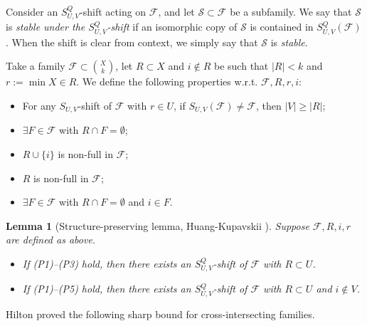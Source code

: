 \documentclass[a4paper,11pt]{article}
\newtheorem{lemma}[theorem]{Lemma}
\newcommand{\m}{\mathcal}
\begin{document}
Consider an $S_{U,V}^Q$-shift acting on $\mathcal{F}$, and let $\mathcal{S} \subset \mathcal{F}$ be a subfamily. 
We say that $\mathcal{S}$ is \emph{stable under the $S_{U,V}^Q$-shift} if an isomorphic copy of $\mathcal{S}$ is contained in $S_{U,V}^Q(\mathcal{F})$. When the shift is clear from context, we simply say that $\mathcal{S}$ is \emph{stable}.


Take a family $\m F\subset {X\choose k}$, let $R\subset X$ and $i\not\in R$ be such that $|R|<k$ and $r:=\min X\in R$. We define the following properties w.r.t. $\m F, R,r, i$: 

\begin{itemize}
\item[(P1)] For any $S_{U,V}$-shift of $\mathcal{F}$ with $r\in U$, if $S_{U,V}(\m F)\ne \m F$, then $|V|\ge |R|$;
\end{itemize}
\vspace{-0.3em}
\noindent
\begin{minipage}[t]{0.48\textwidth}
\begin{itemize}
\item[(P2)] $\exists F\in\mathcal{F}$ with $R\cap F=\emptyset$; 
\item[(P4)] $R\cup\{i\}$ is non-full in $\mathcal{F}$;
\end{itemize}
\end{minipage}
\hfill
\begin{minipage}[t]{0.48\textwidth}
\begin{itemize}
\item[(P3)] $R$ is non-full in $\mathcal{F}$;
\item[(P5)] $\exists F\in\m F$ with $R\cap F=\emptyset$ and $i\in F$.
\end{itemize}
\end{minipage}


\begin{lemma}[Structure-preserving lemma, Huang-Kupavskii \cite{HK2026}]\label{spl}
Suppose $\m F, R, i,r$ are defined as above.  
\begin{itemize}
\item[\rm (i)] If (P1)--(P3) hold, then  there exists an $S_{U,V}^Q$-shift of $\m F$ with $R\subset U$. 
\item[\rm (ii)] If (P1)--(P5) hold, then there exists an $S_{U,V}^Q$-shift of $\m F$ with  $R\subset U$ and $i\not\in V$.
\end{itemize}
\end{lemma}



Hilton \cite{Hilton1977} proved the following sharp bound for cross-intersecting families.
\end{document}
